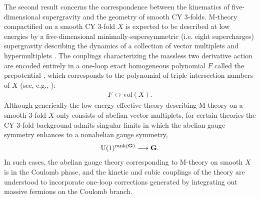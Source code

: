 \documentclass[11pt,oneside,english]{article}
\numberwithin{equation}{section}
\renewcommand*{\to}{\mathchoice{\longrightarrow}{\rightarrow}{\rightarrow}{\rightarrow}}
\theoremstyle{definition}
\begin{document}
The second result concerns the correspondence between the kinematics of five-dimensional supergravity and the geometry of smooth CY 3-folds. M-theory compactified on a smooth CY 3-fold $X$ is expected to be described at low energies by a five-dimensional minimally-supersymmetric (i.e. eight supercharges) supergravity describing the dynamics of a collection of vector multiplets and hypermultiplets \cite{cadavid199511,Antoniadis:1995vz,Ferrara:1996hh,Witten:1996qb}. The couplings characterizing the massless two derivative action are encoded entirely in a one-loop exact homogeneous polynomial $F$ called the prepotential \cite{Seiberg:1996bd}, which corresponds to the polynomial of triple intersection numbers of $X$ (see, e.g., \cite{Intriligator:1997pq}):
	\begin{align}
		 F \longleftrightarrow \text{vol}(X).
	\end{align}
Although generically the low energy effective theory describing M-theory on a smooth 3-fold $X$ only consists of abelian vector multiplets, for certain theories the CY 3-fold background admits singular limits in which the abelian gauge symmetry enhances to a nonabelian gauge symmetry, 
	\begin{align}
		\text{U}(1)^{\text{rank}(\textbf G)} \to \textbf G.
	\end{align}
 In such cases, the abelian gauge theory corresponding to M-theory on smooth $X$ is in the Coulomb phase, and the kinetic and cubic couplings of the theory are understood to incorporate one-loop corrections generated by integrating out massive fermions on the Coulomb branch. 
 
\end{document}
